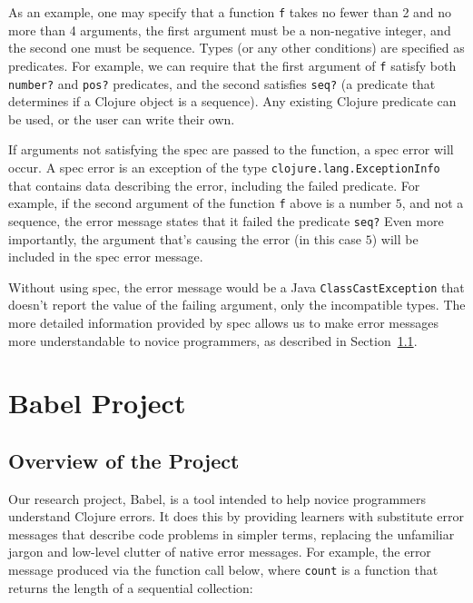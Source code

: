 \documentclass[12pt]{article}
\newcommand{\comment}[1]{}
\newcommand{\emcomment}[1]{\textcolor{ForestGreen}{\comment{Elena: {#1}}}}
\newcommand{\jscomment}[1]{\textcolor{olive}{\comment{Jaydon: {#1}}}}
\begin{document}
As an example, one may specify that a function \texttt{f} takes no fewer than 2 and no more than 4 arguments, the first argument must be a non-negative integer, and the second one must be sequence. 
Types (or any other conditions) are specified as predicates. 
For example, we can require that the first argument of \texttt{f} satisfy both \texttt{number?} and \texttt{pos?} predicates, and the second satisfies \texttt{seq?} (a predicate that determines if a Clojure object is a sequence).
Any existing Clojure predicate can be used, or the user can write their own. 

If arguments not satisfying the spec are passed to the function, a spec error will occur. 
A spec error is an exception of the type \texttt{clojure.lang.ExceptionInfo} that contains data describing the error, including the failed predicate.
For example, if the second argument of the function 
\texttt{f} above is a number $5$, and not a sequence, the error message states that it failed the predicate \texttt{seq?}
Even more importantly, the argument that's causing the error (in this case $5$) will be included in the spec error message.

Without using spec, the error message would be a Java \texttt{ClassCastException} that doesn't report the value of the failing argument, only the incompatible types. 
The more detailed information provided by spec allows us to make error messages more understandable to novice programmers, as described in Section~\ref{subsec:overview}. 

\section{Babel Project}\label{sec:babel}
\subsection{Overview of the Project}\label{subsec:overview}
Our research project, Babel, is a tool intended to help novice programmers understand Clojure errors. It does this by providing learners with substitute error messages that describe code problems in simpler terms, replacing the unfamiliar jargon and low-level clutter of native error messages. For example, the error message produced via the function call below, where \texttt{count} is a function that returns the length of a sequential collection: %
\end{document}
